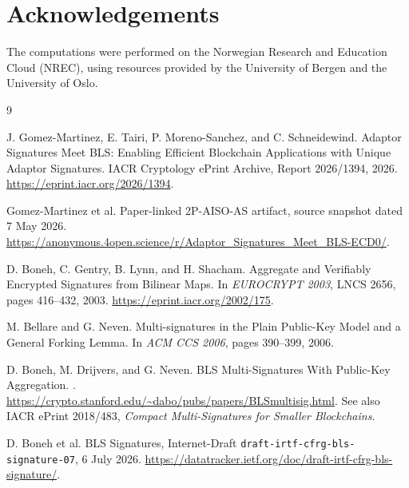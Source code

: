 \documentclass[10pt,a4paper]{article}
\begin{document}
\section*{Acknowledgements}

The computations were performed on the Norwegian Research and Education Cloud (NREC), using resources provided by the University of Bergen and the University of Oslo.

\begin{thebibliography}{9}

J. Gomez-Martinez, E. Tairi, P. Moreno-Sanchez, and C. Schneidewind.
\newblock Adaptor Signatures Meet BLS: Enabling Efficient Blockchain
Applications with Unique Adaptor Signatures.
\newblock IACR Cryptology ePrint Archive, Report 2026/1394, 2026.
\newblock \url{https://eprint.iacr.org/2026/1394}.

Gomez-Martinez et al.
\newblock Paper-linked 2P-AISO-AS artifact, source snapshot dated 7 May 2026.
\newblock \url{https://anonymous.4open.science/r/Adaptor_Signatures_Meet_BLS-ECD0/}.

D. Boneh, C. Gentry, B. Lynn, and H. Shacham.
\newblock Aggregate and Verifiably Encrypted Signatures from Bilinear Maps.
\newblock In \emph{EUROCRYPT 2003}, LNCS 2656, pages 416--432, 2003.
\newblock \url{https://eprint.iacr.org/2002/175}.

M. Bellare and G. Neven.
\newblock Multi-signatures in the Plain Public-Key Model and a General Forking
Lemma.
\newblock In \emph{ACM CCS 2006}, pages 390--399, 2006.

D. Boneh, M. Drijvers, and G. Neven.
\newblock BLS Multi-Signatures With Public-Key Aggregation.
.
\newblock \url{https://crypto.stanford.edu/~dabo/pubs/papers/BLSmultisig.html}.
\newblock See also IACR ePrint 2018/483,
\emph{Compact Multi-Signatures for Smaller Blockchains}.

D. Boneh et al.
\newblock BLS Signatures, Internet-Draft
\texttt{draft-irtf-cfrg-bls-signature-07}, 6 July 2026.
\newblock \url{https://datatracker.ietf.org/doc/draft-irtf-cfrg-bls-signature/}.

\end{thebibliography}
\end{document}

